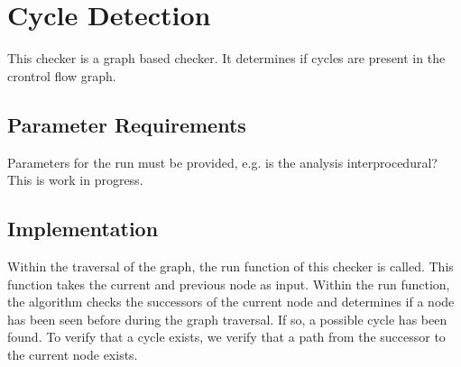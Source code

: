 %
%

\section{Cycle Detection}
\label{CycleDetection::overview}


This checker is a graph based checker. It determines if cycles are present in the crontrol flow graph.

\subsection{Parameter Requirements}


Parameters for the run must be provided, e.g. is the analysis interprocedural?
This is work in progress.

\subsection{Implementation}

Within the traversal of the graph, the run function of this checker is called.
This function takes the current and previous node as input. Within the run
function, the algorithm checks the successors of the current node and determines
if a node has been seen before during the graph traversal. If so, a possible
cycle has been found. To verify that a cycle exists, we verify that a path
from the successor to the current node exists.

